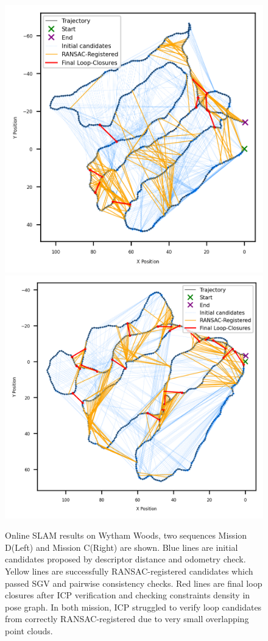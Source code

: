 \begin{figure}[htbp]
  \centering
  \includegraphics[width=0.49\columnwidth]{pics/exp_2_1_wytham_D.png}
  \includegraphics[width=0.49\columnwidth]{pics/exp_2_1_wytham_C.png}
  \caption{Online SLAM results on Wytham Woods, two sequences Mission D(Left) and Mission C(Right) are shown. Blue lines are initial candidates proposed by descriptor distance and odometry check. Yellow lines are successfully RANSAC-registered candidates which passed SGV and pairwise consistency checks. Red lines are final loop closures after ICP verification and checking constraints density in pose graph. In both mission, ICP struggled to verify loop candidates from correctly RANSAC-registered due to very small overlapping point clouds.}
  \label{fig:exp_2_1_wytham_online}
\end{figure}



